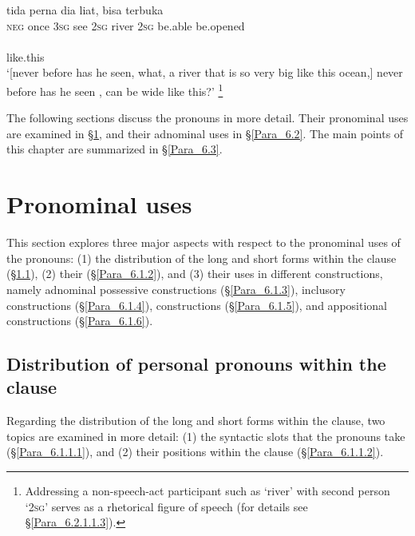 \ea
\label{Example_6.1}
\gll {\ldots} {tida} {perna} {dia} {liat,} {} {} {} {bisa} {terbuka}\\ %
  { } \textsc{neg}  once  \textsc{3sg}  see  \textsc{2sg}  river  \textsc{2sg}  be.able  be.opened\\
\\
 {like.this}\\
 ‘[never before has he seen, what, a river that is so very big like this ocean,] never before has he seen ,  can be wide like this?’ \textstyleExampleSource{[080922-010a-CvNF.0212-0213]}\footnote{Addressing a non-speech-act participant such as  ‘river’ with second person  ‘\textsc{2sg}’ serves as a rhetorical figure of speech (for details see §\ref{Para_6.2.1.1.3}).}
\z

\largerpage

The following sections discuss the pronouns in more detail. Their pronominal uses are examined in §\ref{Para_6.1}, and their adnominal uses in §\ref{Para_6.2}. The main points of this chapter are summarized in §\ref{Para_6.3}.


\section{Pronominal uses}
\label{Para_6.1}
This section explores three major aspects with respect to the pronominal uses of the pronouns: (1) the distribution of the long and short  forms within the clause (§\ref{Para_6.1.1}), (2) their  (§\ref{Para_6.1.2}), and (3) their uses in different constructions, namely adnominal possessive constructions (§\ref{Para_6.1.3}), inclusory  constructions (§\ref{Para_6.1.4}),  constructions (§\ref{Para_6.1.5}), and appositional constructions (§\ref{Para_6.1.6}).


\subsection{Distribution of personal pronouns within the clause}
\label{Para_6.1.1}
Regarding the distribution of the long and short  forms within the clause, two topics are examined in more detail: (1) the syntactic slots that the pronouns take (§\ref{Para_6.1.1.1}), and (2) their positions within the clause (§\ref{Para_6.1.1.2}).


